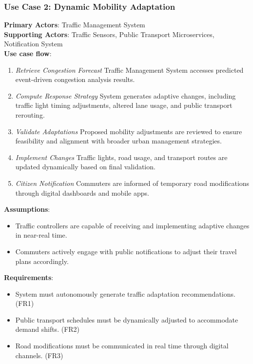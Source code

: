 \documentclass[a4paper,12pt]{article}
\begin{document}
\subsubsection*{Use Case 2: Dynamic Mobility Adaptation}
\textbf{Primary Actors}: Traffic Management System \\
\textbf{Supporting Actors}: Traffic Sensors, Public Transport Microservices, Notification System \\
\textbf{Use case flow}: 
\begin{enumerate}
    \item \textit{Retrieve Congestion Forecast} Traffic Management System accesses predicted event-driven congestion analysis results.
    \item \textit{Compute Response Strategy} System generates adaptive changes, including traffic light timing adjustments, altered lane usage, and public transport rerouting.
    \item \textit{Validate Adaptations} Proposed mobility adjustments are reviewed to ensure feasibility and alignment with broader urban management strategies.
    \item \textit{Implement Changes} Traffic lights, road usage, and transport routes are updated dynamically based on final validation.
    \item \textit{Citizen Notification} Commuters are informed of temporary road modifications through digital dashboards and mobile apps.
\end{enumerate}
\textbf{Assumptions}: 
\begin{itemize}
    \item Traffic controllers are capable of receiving and implementing adaptive changes in near-real time.
    \item Commuters actively engage with public notifications to adjust their travel plans accordingly.
\end{itemize}
\textbf{Requirements}:
\begin{itemize}
    \item System must autonomously generate traffic adaptation recommendations. (FR1)
    \item Public transport schedules must be dynamically adjusted to accommodate demand shifts. (FR2)
    \item Road modifications must be communicated in real time through digital channels. (FR3)
\end{itemize}
\end{document}
